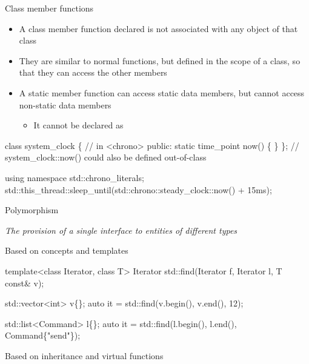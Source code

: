 \begin{frame}[fragile]{Class  member functions}

  \begin{itemize}
  \item A class member function declared  is not associated with
    any object of that class
  \item They are similar to normal functions, but defined in the scope of a
    class, so that they can access the other members
  \item A static member function can access static data members, but cannot
    access non-static data members
    \begin{itemize}
    \item It cannot be declared as 
    \end{itemize}
  \end{itemize}
  \begin{codeblock}
class system_clock \{ // in <chrono>
 public:
  static time_point now() \{ \ddd \}
  \ddd
\};
// system_clock::now() could also be defined out-of-class\end{codeblock}
    \begin{codeblock}
using namespace std::chrono_literals;
std::this_thread\alert{::}sleep_until(std::chrono::steady_clock\alert{::}now() + 15ms);\end{codeblock}

\end{frame}

\begin{frame}[fragile]{Polymorphism}

  \textit{The provision of a single interface to entities of different types}

  \begin{description}
  \item<2-> [static] Based on concepts and templates
    \begin{codeblock}
template<class Iterator, class T>
Iterator std::find(Iterator f, Iterator l, T const& v);

std::vector<int> v\{\ddd\};
auto it = std::find(v.begin(), v.end(), 12);

std::list<Command> l\{\ddd\};
auto it = std::find(l.begin(), l.end(), Command\{"send"\});\end{codeblock}
  \item<3-> [dynamic] Based on inheritance and virtual functions
  \end{description}
\end{frame}

